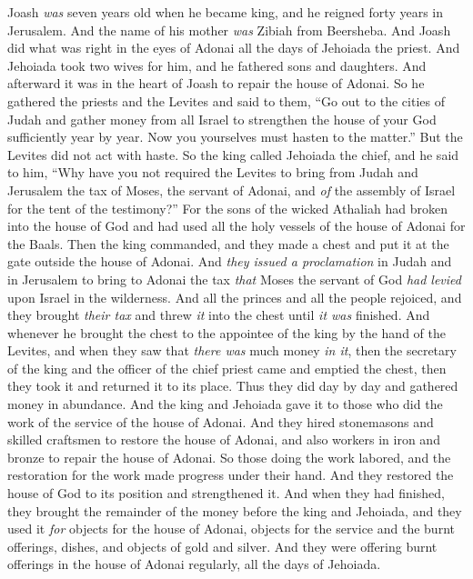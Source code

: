 \begin{biblechapter} %
 Joash \textit{was} seven years old when he became king, and he reigned forty years in Jerusalem. And the name of his mother \textit{was} Zibiah from Beersheba.
\verse And Joash did what was right in the eyes of Adonai all the days of Jehoiada the priest.
\verse And Jehoiada took two wives for him, and he fathered sons and daughters.
\verse And afterward it was in the heart of Joash to repair the house of Adonai.
\verse So he gathered the priests and the Levites and said to them, “Go out to the cities of Judah and gather money from all Israel to strengthen the house of your God sufficiently year by year. Now you yourselves must hasten to the matter.” But the Levites did not act with haste.
\verse So the king called Jehoiada the chief, and he said to him, “Why have you not required the Levites to bring from Judah and Jerusalem the tax of Moses, the servant of Adonai, and \textit{of} the assembly of Israel for the tent of the testimony?”
\verse For the sons of the wicked Athaliah had broken into the house of God and had used all the holy vessels of the house of Adonai for the Baals.
\verse Then the king commanded, and they made a chest and put it at the gate outside the house of Adonai.
\verse And \textit{they issued a proclamation} in Judah and in Jerusalem to bring to Adonai the tax \textit{that} Moses the servant of God \textit{had levied} upon Israel in the wilderness.
\verse And all the princes and all the people rejoiced, and they brought \textit{their tax} and threw \textit{it} into the chest until \textit{it was} finished.
\verse And whenever he brought the chest to the appointee of the king by the hand of the Levites, and when they saw that \textit{there was} much money \textit{in it}, then the secretary of the king and the officer of the chief priest came and emptied the chest, then they took it and returned it to its place. Thus they did day by day and gathered money in abundance.
\verse And the king and Jehoiada gave it to those who did the work of the service of the house of Adonai. And they hired stonemasons and skilled craftsmen to restore the house of Adonai, and also workers in iron and bronze to repair the house of Adonai.
\verse So those doing the work labored, and the restoration for the work made progress under their hand. And they restored the house of God to its position and strengthened it.
\verse And when they had finished, they brought the remainder of the money before the king and Jehoiada, and they used it \textit{for} objects for the house of Adonai, objects for the service and the burnt offerings, dishes, and objects of gold and silver. And they were offering burnt offerings in the house of Adonai regularly, all the days of Jehoiada.

\end{biblechapter}
